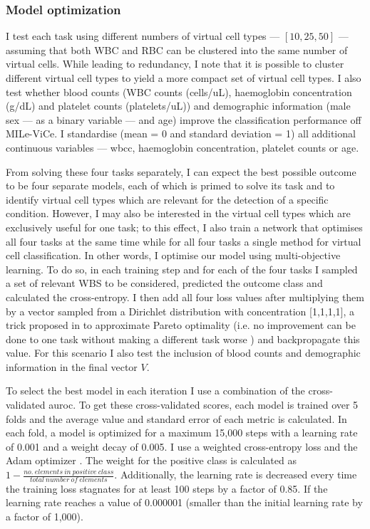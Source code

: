 \subsubsection{Model optimization}

I test each task using different numbers of virtual cell types ---  $[10, 25, 50]$ --- assuming that both WBC and RBC can be clustered into the same number of virtual cells. While leading to redundancy, I note that it is possible to cluster different virtual cell types to yield a more compact set of virtual cell types. I also test whether blood counts (WBC counts (cells/uL), haemoglobin concentration (g/dL) and platelet counts (platelets/uL)) and demographic information (male sex --- as a binary variable --- and age) improve the classification performance off MILe-ViCe. I standardise (mean = 0 and standard deviation = 1) all additional continuous variables --- \ac{wbcc}, haemoglobin concentration, platelet counts or age.

From solving these four tasks separately, I can expect the best possible outcome to be four separate models, each of which is primed to solve its task and to identify virtual cell types which are relevant for the detection of a specific condition. However, I may also be interested in the virtual cell types which are exclusively useful for one task; to this effect, I also train a network that optimises all four tasks at the same time while for all four tasks a single method for virtual cell classification. In other words, I optimise our model using multi-objective learning. To do so, in each training step and for each of the four tasks I sampled a set of relevant WBS to be considered, predicted the outcome class and calculated the cross-entropy. I then add all four loss values after multiplying them by a vector sampled from a Dirichlet distribution with concentration [1,1,1,1], a trick proposed in \cite{Ruchte2021-ch} to approximate Pareto optimality (i.e. no improvement can be done to one task without making a different task worse \cite{Censor1977-nd}) and backpropagate this value. For this scenario I also test the inclusion of blood counts and demographic information in the final vector $V$.

To select the best model in each iteration I use a combination of the cross-validated \ac{auroc}. To get these cross-validated scores, each model is trained over 5 folds and the average value and standard error of each metric is calculated. In each fold, a model is optimized for a maximum 15,000 steps with a learning rate of 0.001 and a weight decay of 0.005. I use a weighted cross-entropy loss and the Adam optimizer \cite{Kingma2014-zd}. The weight for the positive class is calculated as $1 - \frac{no.\ elements\ in\ positive\ class}{total\ number\ of\ elements}$. Additionally, the learning rate is decreased every time the training loss stagnates for at least 100 steps by a factor of 0.85. If the learning rate reaches a value of 0.000001 (smaller than the initial learning rate by a factor of 1,000).

